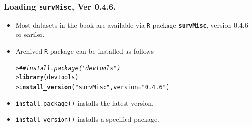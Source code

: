 \documentclass[10pt]{beamer}\usepackage[]{graphicx}\usepackage[]{color}
\makeatletter
\newcommand{\hlstr}[1]{\textcolor[rgb]{0.192,0.494,0.8}{#1}}%
\newcommand{\hlcom}[1]{\textcolor[rgb]{0.678,0.584,0.686}{\textit{#1}}}%
\newcommand{\hlstd}[1]{\textcolor[rgb]{0.345,0.345,0.345}{#1}}%
\newcommand{\hlkwc}[1]{\textcolor[rgb]{0.333,0.667,0.333}{#1}}%
\newcommand{\hlkwd}[1]{\textcolor[rgb]{0.737,0.353,0.396}{\textbf{#1}}}%
\newenvironment{kframe}{%
 \def\at@end@of@kframe{}%
 \ifinner\ifhmode%
  \def\at@end@of@kframe{\end{minipage}}%
  \begin{minipage}{\columnwidth}%
 \fi\fi%
 \def\FrameCommand##1{\hskip\@totalleftmargin \hskip-\fboxsep
 \colorbox{shadecolor}{##1}\hskip-\fboxsep
     \hskip-\linewidth \hskip-\@totalleftmargin \hskip\columnwidth}%
 \MakeFramed {\advance\hsize-\width
   \@totalleftmargin\z@ \linewidth\hsize
   \@setminipage}}%
 {\par\unskip\endMakeFramed%
 \at@end@of@kframe}
\newenvironment{knitrout}{}{} %
\renewenvironment{knitrout}{\setlength{\topsep}{-.2mm}}{}
\newcommand{\pkg}[1]{{\textbf{\texttt{#1}}}}
\newcommand{\R}{\texttt{R} }%
\makeatother
\begin{document}
\begin{frame}[fragile]
  \frametitle{Loading \texttt{survMisc}, Ver 0.4.6.}
  \begin{itemize}
  \item Most datasets in the book are available via \R package \pkg{survMisc}, 
    version 0.4.6 or eariler. 
  \item Archived \R package can be installed as follows
\begin{knitrout}\scriptsize
{}\color{fgcolor}\begin{kframe}
\begin{alltt}
\hlstd{> }\hlcom{## install.package("devtools")}
\hlstd{> }\hlkwd{library}\hlstd{(devtools)}
\hlstd{> }\hlkwd{install_version}\hlstd{(}\hlstr{"survMisc"}\hlstd{,} \hlkwc{version} \hlstd{=} \hlstr{"0.4.6"}\hlstd{)}
\end{alltt}
\end{kframe}
\end{knitrout}
  \item \texttt{install.package()} installs the latest version.
  \item \texttt{install\_version()} installs a specified package.
  \end{itemize}
\end{frame}
\end{document}
